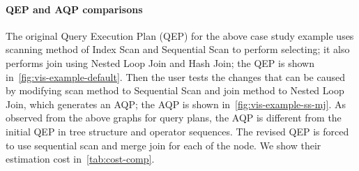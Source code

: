 \paragraph{QEP and AQP comparisons} The original Query Execution Plan (QEP) for the above case study example uses scanning method of Index Scan and Sequential Scan to perform selecting; it also performs join using Nested Loop Join and Hash Join; the QEP is shown in~\cref{fig:vis-example-default}. Then the user tests the changes that can be caused by modifying scan method to Sequential Scan and join method to Nested Loop Join, which generates an AQP; the AQP is shown in~\cref{fig:vis-example-ss-mj}. As observed from the above graphs for query plans, the AQP is different from the initial QEP in tree structure and operator sequences. The revised QEP is forced to use sequential scan and merge join for each of the node. We show their estimation cost in~\cref{tab:cost-comp}.

